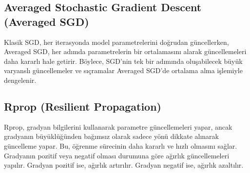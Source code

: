 \newpage

\subsection{Averaged Stochastic Gradient Descent (Averaged SGD)}

Klasik SGD, her iterasyonda model parametrelerini doğrudan güncellerken, Averaged SGD, her adımda parametrelerin bir ortalamasını alarak güncellemeleri daha kararlı hale getirir. Böylece, SGD'nin tek bir adımında oluşabilecek büyük varyanslı güncellemeler ve sıçramalar Averaged SGD'de ortalama alma işlemiyle dengelenir.

\newpage

\subsection{Rprop (Resilient Propagation)}

Rprop, gradyan bilgilerini kullanarak parametre güncellemeleri yapar, ancak gradyanın büyüklüğünden bağımsız olarak sadece yönü dikkate alınarak güncelleme yapar. Bu, öğrenme sürecinin daha kararlı ve hızlı olmasını sağlar. Gradyanın pozitif veya negatif olması durumuna göre ağırlık güncellemeleri yapılır. Gradyan pozitif ise, ağırlık artırılır. Gradyan negatif ise, ağırlık azaltılır.

\newpage
